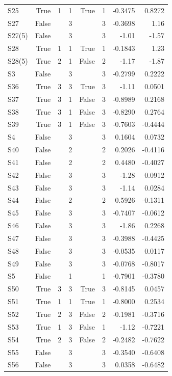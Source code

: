 {\begin{longtable}{lrrrrrrr}
  S25 & True & 1 & 1 & True & 1 & -0.3475 & 0.8272 \\
  S27 & False &  & 3 &  & 3 & -0.3698 & 1.16 \\
  S27(5) & False &  & 3 &  & 3 & -1.01 & -1.57 \\
  S28 & True & 1 & 1 & True & 1 & -0.1843 & 1.23 \\
  S28(5) & True & 2 & 1 & False & 2 & -1.17 & -1.87 \\
  S3 & False &  & 3 &  & 3 & -0.2799 & 0.2222 \\
  S36 & True & 3 & 3 & True & 3 & -1.11 & 0.0501 \\
  S37 & True & 3 & 1 & False & 3 & -0.8989 & 0.2168 \\
  S38 & True & 3 & 1 & False & 3 & -0.8290 & 0.2764 \\
  S39 & True & 3 & 1 & False & 3 & -0.7603 & -0.4444 \\
  S4 & False &  & 3 &  & 3 & 0.1604 & 0.0732 \\
  S40 & False &  & 2 &  & 2 & 0.2026 & -0.4116 \\
  S41 & False &  & 2 &  & 2 & 0.4480 & -0.4027 \\
  S42 & False &  & 3 &  & 3 & -1.28 & 0.0912 \\
  S43 & False &  & 3 &  & 3 & -1.14 & 0.0284 \\
  S44 & False &  & 2 &  & 2 & 0.5926 & -0.1311 \\
  S45 & False &  & 3 &  & 3 & -0.7407 & -0.0612 \\
  S46 & False &  & 3 &  & 3 & -1.86 & 0.2268 \\
  S47 & False &  & 3 &  & 3 & -0.3988 & -0.4425 \\
  S48 & False &  & 3 &  & 3 & -0.0535 & 0.0117 \\
  S49 & False &  & 3 &  & 3 & -0.0768 & -0.8017 \\
  S5 & False &  & 1 &  & 1 & -0.7901 & -0.3780 \\
  S50 & True & 3 & 3 & True & 3 & -0.8145 & 0.0457 \\
  S51 & True & 1 & 1 & True & 1 & -0.8000 & 0.2534 \\
  S52 & True & 2 & 3 & False & 2 & -0.1981 & -0.3716 \\
  S53 & True & 1 & 3 & False & 1 & -1.12 & -0.7221 \\
  S54 & True & 2 & 3 & False & 2 & -0.2482 & -0.7622 \\
  S55 & False &  & 3 &  & 3 & -0.3540 & -0.6408 \\
  S56 & False &  & 3 &  & 3 & 0.0358 & -0.6482 \\

\end{longtable}}
